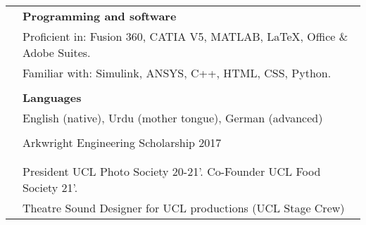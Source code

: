 \documentclass[letterpaper, 11pt]{article}
\begin{document}
\begin{longtable}{p{1.3in}p{4.8in}}

{\color{OliveGreen}{Skills}} 
& \textbf{Programming and software}\\
& Proficient in: Fusion 360, CATIA V5, MATLAB, \LaTeX, Office \& Adobe Suites. \\
& Familiar with: Simulink, ANSYS, C++, HTML, CSS, Python. \\
& \\

& \textbf{Languages} \\
& English (native), Urdu (mother tongue), German (advanced) \\
& \\


{\color{OliveGreen}{Honours and}} 
& Arkwright Engineering Scholarship \hfill 2017\\
{\color{OliveGreen}{scholarships}} 
& \\
& \\


\nohyphens{\color{OliveGreen}{Other interests}} 
& President UCL Photo Society 20-21'. Co-Founder UCL Food Society 21'.\\ 
& Theatre Sound Designer for UCL productions (UCL Stage Crew)\\


\end{longtable}
\end{document}
